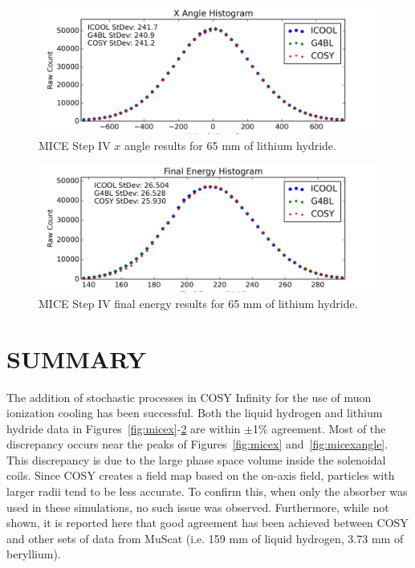 \documentclass[a4paper,11pt]{article}
\begin{document}
\begin{figure}[htb]
  \centering
    \includegraphics[width=\columnwidth]{Figures/px_LiH} 
  \caption{MICE Step IV $x$ angle results for 65 mm of lithium hydride.}
  \label{fig:mice_lih_xangle}
\end{figure}

\begin{figure}[htb]
  \centering
    \includegraphics[width=\columnwidth]{Figures/e_LiH} 
  \caption{MICE Step IV final energy results for 65 mm of lithium hydride.}
  \label{fig:mice_lih_energy}
\end{figure}

\section{SUMMARY}
The addition of stochastic processes in COSY Infinity for the use of muon ionization cooling has been successful. Both the liquid hydrogen and lithium hydride data in Figures~\ref{fig:micex}-\ref{fig:mice_lih_energy} are within $\pm$1\% agreement. Most of the discrepancy occurs near the peaks of Figures~\ref{fig:micex} and~\ref{fig:micexangle}. This discrepancy is due to the large phase space volume inside the solenoidal coils. Since COSY creates a field map based on the on-axis field, particles with larger radii tend to be less accurate. To confirm this, when only the absorber was used in these simulations, no such issue was observed. Furthermore, while not shown, it is reported here that good agreement has been achieved between COSY and other sets of data from MuScat \cite{Muscat} (i.e. 159 mm of liquid hydrogen, 3.73 mm of beryllium).
\end{document}
